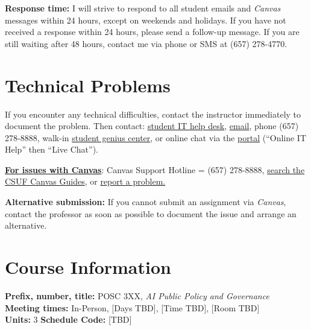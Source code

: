 \documentclass[12pt]{article}
\begin{document}
\vspace{0.5em}
\noindent \textbf{Response time:} I will strive to respond to all student emails and \emph{Canvas} messages within 24 hours, except on weekends and holidays. If you have not received a response within 24 hours, please send a follow-up message. If you are still waiting after 48 hours, contact me via phone or SMS at (657) 278-4770.

\section*{Technical Problems}

If you encounter any technical difficulties, contact the instructor immediately to document the problem. Then contact: \href{http://www.fullerton.edu/it/students/helpdesk/index.php}{student IT help desk}, \href{mailto:StudentITHelpDesk@fullerton.edu}{email}, phone (657) 278-8888, walk-in \href{http://www.fullerton.edu/it/students/sgc/index.php}{student genius center}, or online chat via the \href{http://my.fullerton.edu}{portal} (``Online IT Help'' then ``Live Chat'').

\vspace{0.5em}
\noindent \textbf{\underline{For issues with Canvas}}: Canvas Support Hotline = (657) 278-8888, \href{https://canvashelp.fullerton.edu/}{search the CSUF Canvas Guides}, or \href{https://titans.service-now.com/sp?id=sc_cat_item&sys_id=f88efe80ebea6a10fb7cfcffcad0cdc6&subject=Canvas}{report a problem.}

\vspace{0.5em}
\noindent \textbf{Alternative submission:} If you cannot submit an assignment via \emph{Canvas}, contact the professor as soon as possible to document the issue and arrange an alternative.

\section*{Course Information}
\noindent \textbf{Prefix, number, title:} POSC 3XX, \textit{AI Public Policy and Governance} \\
\noindent \textbf{Meeting times:} In-Person, [Days TBD], [Time TBD], [Room TBD] \\
\noindent \textbf{Units:} 3 \quad \textbf{Schedule Code:} [TBD]
\end{document}

